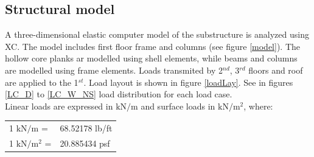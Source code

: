 \subsection{Structural model}
A three-dimensional elastic computer model of the substructure is analyzed using XC. The model includes first floor frame and columns (see figure \ref{model}). The hollow core planks ar modelled using shell elements, while beams and columns are modelled using frame elements. Loads transmited by 2$^{nd}$, 3$^{rd}$ floors and roof are applied to the 1$^{st}$. Load layout is shown in figure \ref{loadLay}. See in figures \ref{LC_D} to \ref{LC_W_NS} load distribution for each load case.\\

Linear loads are expressed in $\mathrm{kN/m}$ and surface loads in $\mathrm{kN/m^2}$, where:\\
\begin{center}
  \begin{tabular}{ll}
    1 $\mathrm{kN/m}$ = & 68.52178 lb/ft \\
    1 $\mathrm{kN/m^2}$ = & 20.885434 psf \\
  \end{tabular}
  \end{center}

